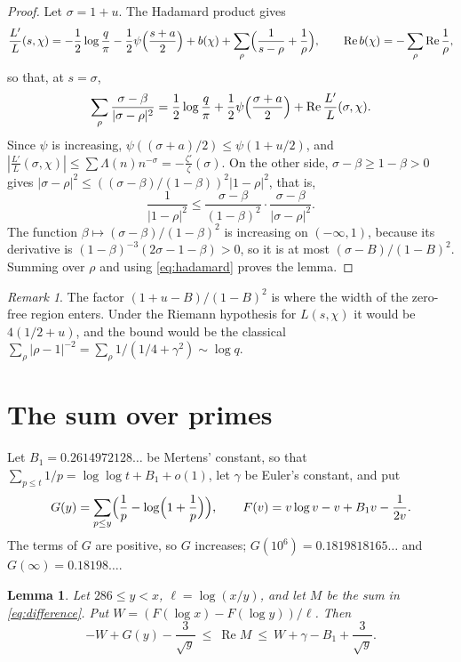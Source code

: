 \documentclass[11pt]{amsart}
\newtheorem{lemma}[theorem]{Lemma}
\theoremstyle{definition}
\theoremstyle{remark}
\newtheorem{remark}[theorem]{Remark}
\renewcommand{\Re}{\operatorname{Re}}
\begin{document}
\begin{proof}
Let $\sigma=1+u$. The Hadamard product \cite[Chapter 12]{Dav80} gives
\[
\frac{L'}{L}(s,\chi)=-\frac12\log\frac q\pi-\frac12\psi\Bigl(\frac{s+a}2\Bigr)+b(\chi)+\sum_\rho\Bigl(\frac1{s-\rho}+\frac1\rho\Bigr),\qquad \Re b(\chi)=-\sum_\rho\Re\frac1\rho,
\]
so that, at $s=\sigma$,
\begin{equation}\label{eq:hadamard}
\sum_\rho\frac{\sigma-\beta}{|\sigma-\rho|^2}=\frac12\log\frac q\pi+\frac12\psi\Bigl(\frac{\sigma+a}2\Bigr)+\Re\frac{L'}{L}(\sigma,\chi).
\end{equation}
Since $\psi$ is increasing, $\psi((\sigma+a)/2)\le\psi(1+u/2)$, and $|\frac{L'}{L}(\sigma,\chi)|\le\sum\Lambda(n)n^{-\sigma}=-\frac{\zeta'}{\zeta}(\sigma)$. On the other side, $\sigma-\beta\ge1-\beta>0$ gives $|\sigma-\rho|^2\le((\sigma-\beta)/(1-\beta))^2|1-\rho|^2$, that is,
\[
\frac1{|1-\rho|^2}\le\frac{\sigma-\beta}{(1-\beta)^2}\cdot\frac{\sigma-\beta}{|\sigma-\rho|^2}.
\]
The function $\beta\mapsto(\sigma-\beta)/(1-\beta)^2$ is increasing on $(-\infty,1)$, because its derivative is $(1-\beta)^{-3}(2\sigma-1-\beta)>0$, so it is at most $(\sigma-B)/(1-B)^2$. Summing over $\rho$ and using \eqref{eq:hadamard} proves the lemma.
\end{proof}

\begin{remark}
The factor $(1+u-B)/(1-B)^2$ is where the width of the zero-free region enters. Under the Riemann hypothesis for $L(s,\chi)$ it would be $4(1/2+u)$, and the bound would be the classical $\sum_\rho|\rho-1|^{-2}=\sum_\rho 1/(1/4+\gamma^2)\sim\log q$.
\end{remark}

\section{The sum over primes}\label{sec:primes}

Let $B_1=0.2614972128\ldots$ be Mertens' constant, so that $\sum_{p\le t}1/p=\log\log t+B_1+o(1)$, let $\gamma$ be Euler's constant, and put
\[
G(y)=\sum_{p\le y}\Bigl(\frac1p-\log\Bigl(1+\frac1p\Bigr)\Bigr),\qquad F(v)=v\log v-v+B_1v-\frac1{2v}.
\]
The terms of $G$ are positive, so $G$ increases; $G(10^6)=0.1819818165\ldots$ and $G(\infty)=0.18198\ldots$.

\begin{lemma}\label{lem:primes}
Let $286\le y<x$, $\ell=\log(x/y)$, and let $M$ be the sum in \eqref{eq:difference}. Put $W=(F(\log x)-F(\log y))/\ell$. Then
\[
-W+G(y)-\frac3{\sqrt y}\ \le\ \Re M\ \le\ W+\gamma-B_1+\frac3{\sqrt y}.
\]
\end{lemma}
\end{document}
